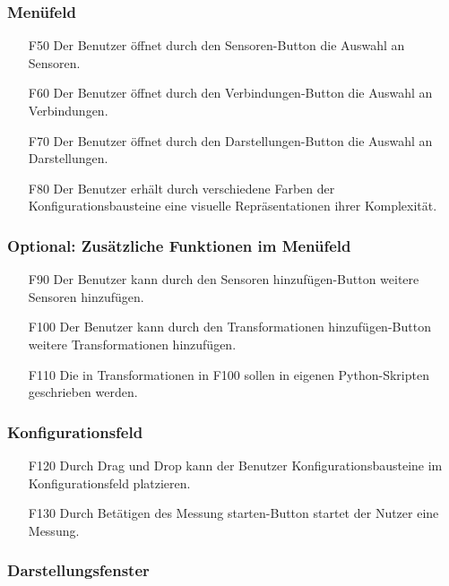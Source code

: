 \documentclass[parskip=full]{scrartcl}
\begin{document}
\subsubsection{Menüfeld}

\begin{itemize}
\item[F50] Der Benutzer öffnet durch den Sensoren-Button die Auswahl an Sensoren.
\item[F60] Der Benutzer öffnet durch den Verbindungen-Button die Auswahl an Verbindungen.
\item[F70] Der Benutzer öffnet durch den Darstellungen-Button die Auswahl an Darstellungen.
\item[F80] Der Benutzer erhält durch verschiedene Farben der Konfigurationsbausteine eine visuelle Repräsentationen ihrer Komplexität.
\end{itemize}

\subsubsection{Optional: Zusätzliche Funktionen im Menüfeld}

\begin{itemize}

\item[F90] Der Benutzer kann durch den Sensoren hinzufügen-Button weitere Sensoren hinzufügen.
\item[F100] Der Benutzer kann durch den Transformationen hinzufügen-Button weitere Transformationen hinzufügen.
\item[F110] Die in Transformationen in F100 sollen in eigenen Python-Skripten geschrieben werden.
\end{itemize}

\subsubsection{Konfigurationsfeld}

\begin{itemize}
\item[F120] Durch Drag und Drop kann der Benutzer Konfigurationsbausteine im Konfigurationsfeld platzieren.
\item[F130] Durch Betätigen des Messung starten-Button startet der Nutzer eine Messung.
\end{itemize}

\subsubsection{Darstellungsfenster}
\end{document}
